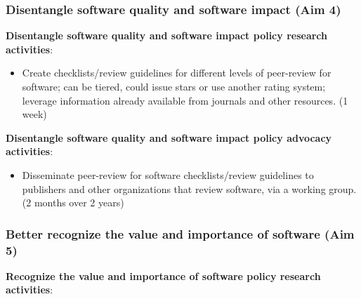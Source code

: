 \documentclass[
]{book}
\providecommand{\tightlist}{%
  \setlength{\itemsep}{0pt}\setlength{\parskip}{0pt}}
\begin{document}
\hypertarget{disentangle-software-quality-and-software-impact-aim-4}{%
\subsubsection{Disentangle software quality and software impact (Aim 4)}\label{disentangle-software-quality-and-software-impact-aim-4}}

\textbf{Disentangle software quality and software impact policy research activities}:

\begin{itemize}
\tightlist
\item
  Create checklists/review guidelines for different levels of peer-review for software; can be
  tiered, could issue stars or use another rating system; leverage information already available
  from journals and other resources. (1 week)
\end{itemize}

\textbf{Disentangle software quality and software impact policy advocacy activities}:

\begin{itemize}
\tightlist
\item
  Disseminate peer-review for software checklists/review guidelines to publishers and other organizations
  that review software, via a working group. (2 months over 2 years)
\end{itemize}

\hypertarget{better-recognize-the-value-and-importance-of-software-aim-5}{%
\subsubsection{Better recognize the value and importance of software (Aim 5)}\label{better-recognize-the-value-and-importance-of-software-aim-5}}

\textbf{Recognize the value and importance of software policy research activities}:
\end{document}
